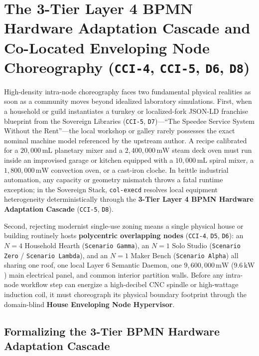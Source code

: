 \section{The 3-Tier Layer 4 BPMN Hardware Adaptation Cascade and Co-Located Enveloping Node Choreography (\texttt{CCI-4}, \texttt{CCI-5}, \texttt{D6}, \texttt{D8})}
\label{sec:bpmn-hardware-cascade-and-envelope}

High-density intra-node choreography faces two fundamental physical realities as soon as a community moves beyond idealized laboratory simulations. First, when a household or guild instantiates a turnkey or localized-fork JSON-LD franchise blueprint from the Sovereign Libraries (\texttt{CCI-5}, \texttt{D7})---``The Speedee Service System Without the Rent''---the local workshop or galley rarely possesses the exact nominal machine model referenced by the upstream author. A recipe calibrated for a $20{,}000\,\mathrm{mL}$ planetary mixer and a $2{,}400{,}000\,\mathrm{mW}$ steam deck oven must run inside an improvised garage or kitchen equipped with a $10{,}000\,\mathrm{mL}$ spiral mixer, a $1{,}800{,}000\,\mathrm{mW}$ convection oven, or a cast-iron cloche. In brittle industrial automation, any capacity or geometry mismatch throws a fatal runtime exception; in the Sovereign Stack, \texttt{col-execd} resolves local equipment heterogeneity deterministically through the \textbf{3-Tier Layer 4 BPMN Hardware Adaptation Cascade} (\texttt{CCI-5}, \texttt{D8}).

Second, rejecting modernist single-use zoning means a single physical house or building routinely hosts \textbf{polycentric overlapping nodes} (\texttt{CCI-4}, \texttt{D5}, \texttt{D6}): an $N=4$ Household Hearth (\texttt{Scenario Gamma}), an $N=1$ Solo Studio (\texttt{Scenario Zero} / \texttt{Scenario Lambda}), and an $N=1$ Maker Bench (\texttt{Scenario Alpha}) all sharing one roof, one local Layer 6 Semantic Daemon, one $9{,}600{,}000\,\mathrm{mW}$ ($9.6\,\mathrm{kW}$) main electrical panel, and common interior partition walls. Before any intra-node workflow step can energize a high-decibel CNC spindle or high-wattage induction coil, it must choreograph its physical boundary footprint through the domain-blind \textbf{House Enveloping Node Hypervisor}.

\subsection{Formalizing the 3-Tier BPMN Hardware Adaptation Cascade}
\label{subsec:three-tier-bpmn-cascade}

